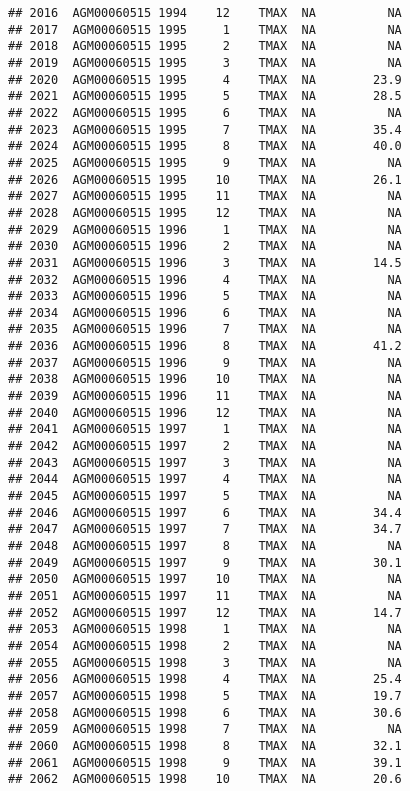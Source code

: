 \documentclass{article}\usepackage[]{graphicx}\usepackage[]{color}
\makeatletter
\newenvironment{kframe}{%
 \def\at@end@of@kframe{}%
 \ifinner\ifhmode%
  \def\at@end@of@kframe{\end{minipage}}%
  \begin{minipage}{\columnwidth}%
 \fi\fi%
 \def\FrameCommand##1{\hskip\@totalleftmargin \hskip-\fboxsep
 \colorbox{shadecolor}{##1}\hskip-\fboxsep
     \hskip-\linewidth \hskip-\@totalleftmargin \hskip\columnwidth}%
 \MakeFramed {\advance\hsize-\width
   \@totalleftmargin\z@ \linewidth\hsize
   \@setminipage}}%
 {\par\unskip\endMakeFramed%
 \at@end@of@kframe}
\newenvironment{knitrout}{}{} %
\makeatother
\begin{document}
\begin{knitrout}
\begin{kframe}
\begin{verbatim}
## 2016  AGM00060515 1994    12    TMAX  NA          NA
## 2017  AGM00060515 1995     1    TMAX  NA          NA
## 2018  AGM00060515 1995     2    TMAX  NA          NA
## 2019  AGM00060515 1995     3    TMAX  NA          NA
## 2020  AGM00060515 1995     4    TMAX  NA        23.9
## 2021  AGM00060515 1995     5    TMAX  NA        28.5
## 2022  AGM00060515 1995     6    TMAX  NA          NA
## 2023  AGM00060515 1995     7    TMAX  NA        35.4
## 2024  AGM00060515 1995     8    TMAX  NA        40.0
## 2025  AGM00060515 1995     9    TMAX  NA          NA
## 2026  AGM00060515 1995    10    TMAX  NA        26.1
## 2027  AGM00060515 1995    11    TMAX  NA          NA
## 2028  AGM00060515 1995    12    TMAX  NA          NA
## 2029  AGM00060515 1996     1    TMAX  NA          NA
## 2030  AGM00060515 1996     2    TMAX  NA          NA
## 2031  AGM00060515 1996     3    TMAX  NA        14.5
## 2032  AGM00060515 1996     4    TMAX  NA          NA
## 2033  AGM00060515 1996     5    TMAX  NA          NA
## 2034  AGM00060515 1996     6    TMAX  NA          NA
## 2035  AGM00060515 1996     7    TMAX  NA          NA
## 2036  AGM00060515 1996     8    TMAX  NA        41.2
## 2037  AGM00060515 1996     9    TMAX  NA          NA
## 2038  AGM00060515 1996    10    TMAX  NA          NA
## 2039  AGM00060515 1996    11    TMAX  NA          NA
## 2040  AGM00060515 1996    12    TMAX  NA          NA
## 2041  AGM00060515 1997     1    TMAX  NA          NA
## 2042  AGM00060515 1997     2    TMAX  NA          NA
## 2043  AGM00060515 1997     3    TMAX  NA          NA
## 2044  AGM00060515 1997     4    TMAX  NA          NA
## 2045  AGM00060515 1997     5    TMAX  NA          NA
## 2046  AGM00060515 1997     6    TMAX  NA        34.4
## 2047  AGM00060515 1997     7    TMAX  NA        34.7
## 2048  AGM00060515 1997     8    TMAX  NA          NA
## 2049  AGM00060515 1997     9    TMAX  NA        30.1
## 2050  AGM00060515 1997    10    TMAX  NA          NA
## 2051  AGM00060515 1997    11    TMAX  NA          NA
## 2052  AGM00060515 1997    12    TMAX  NA        14.7
## 2053  AGM00060515 1998     1    TMAX  NA          NA
## 2054  AGM00060515 1998     2    TMAX  NA          NA
## 2055  AGM00060515 1998     3    TMAX  NA          NA
## 2056  AGM00060515 1998     4    TMAX  NA        25.4
## 2057  AGM00060515 1998     5    TMAX  NA        19.7
## 2058  AGM00060515 1998     6    TMAX  NA        30.6
## 2059  AGM00060515 1998     7    TMAX  NA          NA
## 2060  AGM00060515 1998     8    TMAX  NA        32.1
## 2061  AGM00060515 1998     9    TMAX  NA        39.1
## 2062  AGM00060515 1998    10    TMAX  NA        20.6

\end{verbatim}
\end{kframe}
\end{knitrout}
\end{document}

